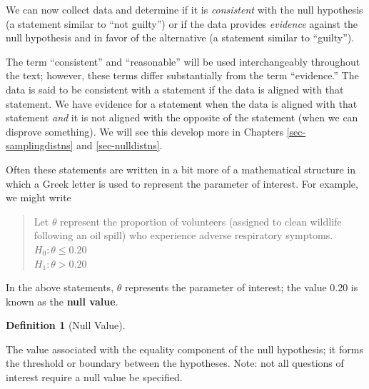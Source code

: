 \documentclass[
  letterpaper,
  DIV=11,
  numbers=noendperiod]{scrreprt}
\theoremstyle{plain}
\theoremstyle{definition}
\theoremstyle{definition}
\newtheorem{definition}{Definition}[chapter]
\theoremstyle{remark}
\begin{document}
We can now collect data and determine if it is \emph{consistent} with
the null hypothesis (a statement similar to ``not guilty'') or if the
data provides \emph{evidence} against the null hypothesis and in favor
of the alternative (a statement similar to ``guilty'').

\begin{tcolorbox}[enhanced jigsaw, breakable, titlerule=0mm, colframe=quarto-callout-warning-color-frame, bottomtitle=1mm, opacityback=0, rightrule=.15mm, toptitle=1mm, arc=.35mm, bottomrule=.15mm, left=2mm, title=\textcolor{quarto-callout-warning-color}{\faExclamationTriangle}\hspace{0.5em}{Consistent vs.~Evidence}, leftrule=.75mm, coltitle=black, toprule=.15mm, colbacktitle=quarto-callout-warning-color!10!white, colback=white, opacitybacktitle=0.6]

The term ``consistent'' and ``reasonable'' will be used interchangeably
throughout the text; however, these terms differ substantially from the
term ``evidence.'' The data is said to be consistent with a statement if
the data is aligned with that statement. We have evidence for a
statement when the data is aligned with that statement \emph{and} it is
not aligned with the opposite of the statement (when we can disprove
something). We will see this develop more in Chapters
\ref{sec-samplingdistns} and \ref{sec-nulldistns}.

\end{tcolorbox}

Often these statements are written in a bit more of a mathematical
structure in which a Greek letter is used to represent the parameter of
interest. For example, we might write

\begin{quote}
Let \(\theta\) represent the proportion of volunteers (assigned to clean
wildlife following an oil spill) who experience adverse respiratory
symptoms.\\
\(H_0: \theta \leq 0.20\)\\
\(H_1: \theta > 0.20\)
\end{quote}

In the above statements, \(\theta\) represents the parameter of
interest; the value 0.20 is known as the \textbf{null value}.

\begin{definition}[Null
Value]\protect\hypertarget{def-null-value}{}\label{def-null-value}

The value associated with the equality component of the null hypothesis;
it forms the threshold or boundary between the hypotheses. Note: not all
questions of interest require a null value be specified.

\end{definition}
\end{document}

